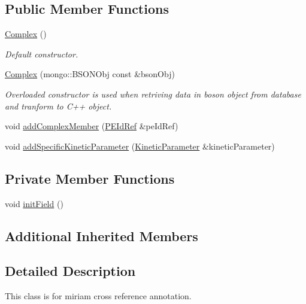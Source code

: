 \subsection*{Public Member Functions}
\begin{DoxyCompactItemize}
\item 
\hyperlink{classunisys_1_1Complex_af1f053767f82558fca1aacbe506c80b3}{Complex} ()
\begin{DoxyCompactList}\small\item\em Default constructor. \end{DoxyCompactList}\item 
\hyperlink{classunisys_1_1Complex_adf5a0991130d29373856723ca7c90e69}{Complex} (mongo\-::\-B\-S\-O\-N\-Obj const \&bson\-Obj)
\begin{DoxyCompactList}\small\item\em Overloaded constructor is used when retriving data in boson object from database and tranform to C++ object. \end{DoxyCompactList}\item 
void \hyperlink{classunisys_1_1Complex_a31f85126c8248ca57b0a64a54fa8f10f}{add\-Complex\-Member} (\hyperlink{classunisys_1_1PEIdRef}{P\-E\-Id\-Ref} \&pe\-Id\-Ref)
\item 
void \hyperlink{classunisys_1_1Complex_af60845ea26c2e255e3d707a45ce67717}{add\-Specific\-Kinetic\-Parameter} (\hyperlink{classunisys_1_1KineticParameter}{Kinetic\-Parameter} \&kinetic\-Parameter)
\end{DoxyCompactItemize}
\subsection*{Private Member Functions}
\begin{DoxyCompactItemize}
\item 
void \hyperlink{classunisys_1_1Complex_a63e019fcca3e2d919937694678d9ee1f}{init\-Field} ()
\end{DoxyCompactItemize}
\subsection*{Additional Inherited Members}


\subsection{Detailed Description}
This class is for miriam cross reference annotation. 

